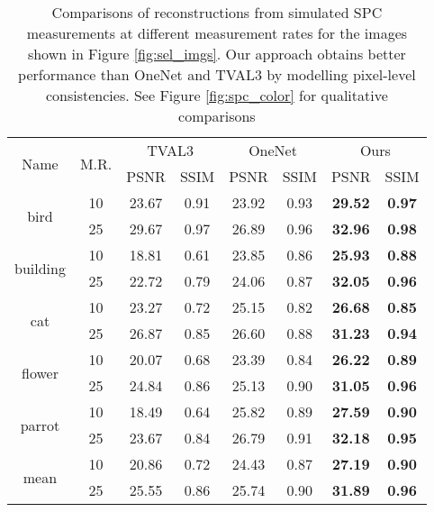 \documentclass[journal,twoside]{IEEEtran}
\begin{document}
\begin{table}[h]
\renewcommand{\arraystretch}{1.3}
\caption{Comparisons of reconstructions from simulated SPC measurements at different measurement rates for the images shown in Figure \ref{fig:sel_imgs}. Our approach obtains better performance than OneNet and TVAL3 by modelling pixel-level consistencies. See Figure \ref{fig:spc_color} for qualitative comparisons}
\label{table:spc}
\begin{center}
\begin{tabular}{cccccccc}

\toprule
    \multirow{2}{*}{ Name}&\multirow{2}{*}{M.R.}&\multicolumn{2}{c}{TVAL3}&\multicolumn{2}{c}{OneNet}&\multicolumn{2}{c}{Ours}\\
    \cline{3-8} & &  PSNR & SSIM & PSNR & SSIM  & PSNR & SSIM  \\
\midrule
 \multirow{2}{*}{bird} &10 & 23.67 & 0.91 & 23.92 & 0.93 & \textbf{29.52} & \textbf{0.97} \\
&25 & 29.67 & 0.97 & 26.89 & 0.96 & \textbf{32.96} & \textbf{0.98} \\
\midrule
 \multirow{2}{*}{building} &10 & 18.81 & 0.61 & 23.85 & 0.86 & \textbf{25.93} & \textbf{0.88} \\
&25  & 22.72 & 0.79 & 24.06 & 0.87 & \textbf{32.05} & \textbf{0.96} \\
\midrule
 \multirow{2}{*}{cat} &10  & 23.27 & 0.72 & 25.15 & 0.82 & \textbf{26.68} & \textbf{0.85} \\
&25  & 26.87 & 0.85 & 26.60 & 0.88 & \textbf{31.23} & \textbf{0.94} \\
\midrule
 \multirow{2}{*}{flower} &10  & 20.07 & 0.68 & 23.39 & 0.84 & \textbf{26.22} & \textbf{0.89} \\
&25  & 24.84 & 0.86 & 25.13 & 0.90 & \textbf{31.05} & \textbf{0.96} \\
\midrule
 \multirow{2}{*}{parrot} &10  & 18.49 & 0.64 & 25.82 & 0.89 & \textbf{27.59} & \textbf{0.90} \\
&25  & 23.67 & 0.84 & 26.79 & 0.91 & \textbf{32.18} & \textbf{0.95} \\
\midrule
 \multirow{2}{*}{mean} &10  &  20.86 & 0.72 & 24.43 & 0.87 & \textbf{27.19} & \textbf{0.90} \\
&25  &  25.55 & 0.86 & 25.74 & 0.90 & \textbf{31.89} & \textbf{0.96} \\
\bottomrule
\end{tabular}
\end{center}
\end{table}
\end{document}
